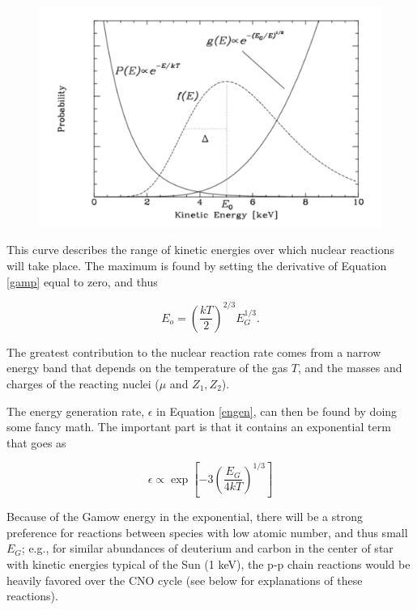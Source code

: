 \begin{figure}[h!]
\begin{center}
\includegraphics[width=.9\textwidth]{gamow_peak.pdf}
\end{center}
\end{figure}

This curve describes the range of kinetic energies over which nuclear reactions will take place.  The maximum is found by setting the derivative of Equation \ref{gamp} equal to zero, and thus

\begin{equation}
E_{o} = \left( \frac{kT}{2} \right)^{2/3} E_{G}^{1/3}.
\end{equation}

The greatest contribution to the nuclear reaction rate comes from a narrow energy band that depends on the temperature of the gas $T$, and the masses and charges of the reacting nuclei ($\mu$ and $Z_{1},Z_{2}$).

The energy generation rate, $\epsilon$ in Equation \ref{engen}, can then be found by doing some fancy math.  The important part is that it contains an exponential term that goes as 

\begin{equation}
\epsilon \propto \exp \left[ -3 \left( \frac{E_{G}}{4kT}\right)^{1/3} \right]
\end{equation}

Because of the Gamow energy in the exponential, there will be a strong preference for reactions between species with low atomic number, and thus small $E_{G}$; e.g., for similar abundances of deuterium and carbon in the center of star with kinetic energies typical of the Sun (1 keV), the p-p chain reactions would be heavily favored over the CNO cycle (see below for explanations of these reactions).


